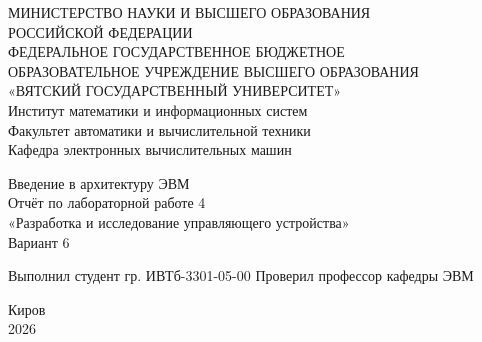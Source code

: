 \documentclass[oneside,a4paper,14pt]{extarticle}
\begin{document}
\newpage\thispagestyle{empty}
\begin{center}
	МИНИСТЕРСТВО НАУКИ И ВЫСШЕГО ОБРАЗОВАНИЯ\\
	РОССИЙСКОЙ ФЕДЕРАЦИИ\\
	ФЕДЕРАЛЬНОЕ ГОСУДАРСТВЕННОЕ БЮДЖЕТНОЕ\\
	ОБРАЗОВАТЕЛЬНОЕ УЧРЕЖДЕНИЕ ВЫСШЕГО ОБРАЗОВАНИЯ\\
	«ВЯТСКИЙ ГОСУДАРСТВЕННЫЙ УНИВЕРСИТЕТ»\\
	Институт математики и информационных систем\\
	Факультет автоматики и вычислительной техники\\
	Кафедра электронных вычислительных машин
\end{center}
\vspace{20mm}
\begin{center}
	Введение в архитектуру ЭВМ\\
	Отчёт по лабораторной работе 4\\
	«Разработка и исследование управляющего устройства»\\
	Вариант 6
\end{center}
\vfill
Выполнил студент гр. ИВТб-3301-05-00 \hfill
{}
Проверил профессор кафедры ЭВМ\hfill
{}
\vfill
\begin{center}
	Киров\\
	2026
\end{center}
\end{document}
